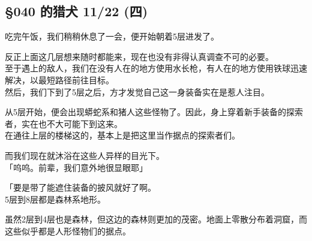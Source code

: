 \subsection{§040 的猎犬 11/22 (四)}

吃完午饭，我们稍稍休息了一会，便开始朝着5层进发了。

反正上面这几层想来随时都能来，现在也没有非得认真调查不可的必要。\\

至于遇上的敌人，我们在没有人在的地方使用水长枪，有人在的地方使用铁球迅速解决，以最短路径前往目标。\\

然后，我们下到了5层之后，方才发觉自己这一身装备实在是惹人注目。

从5层开始，便会出现蟒蛇系和猪人这些怪物了。因此，身上穿着新手装备的探索者，实在也不大可能下到这来。\\

在通往上层的楼梯这的，基本上是把这里当作据点的探索者们。

而我们现在就沐浴在这些人异样的目光下。\\

「呜呜。前辈，我们意外地很显眼耶」

「要是带了能遮住装备的披风就好了啊。\\

5层到8层都是森林系地形。

虽然2层到4层也是森林，但这边的森林则更加的茂密。地面上零散分布着洞窟，而这些似乎都是人形怪物们的据点。\\

